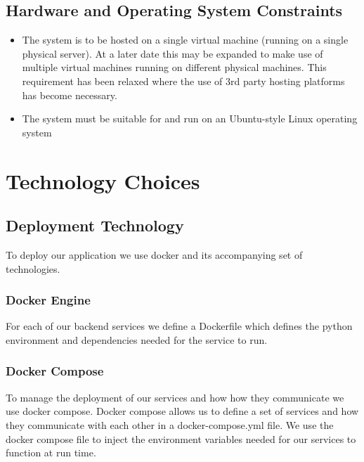 \documentclass[12pt]{article}
\begin{document}
\subsection{Hardware and Operating System Constraints}
\begin{itemize}
    \item The system is to be hosted on a single virtual machine (running on a single physical server). At a later date this may be expanded to make use of multiple virtual machines running on different physical machines. This requirement has been relaxed where the use of 3rd party hosting platforms has become necessary.
    \item The system must be suitable for and run on an Ubuntu-style Linux operating system
\end{itemize}

\newpage

\section{Technology Choices}

\subsection{Deployment Technology}


To deploy our application we use docker and its accompanying set of technologies.
\subsubsection{Docker Engine}
    For each of our backend services we define a Dockerfile which defines the python environment and dependencies needed for the service to run.
\subsubsection{Docker Compose}
    To manage the deployment of our services and how how they communicate we use docker compose.
    \newline Docker compose allows us to define a set of services and how they communicate with each other in a docker-compose.yml file.
    \newline We use the docker compose file to inject the environment variables needed for our services to function at run time.
\end{document}

